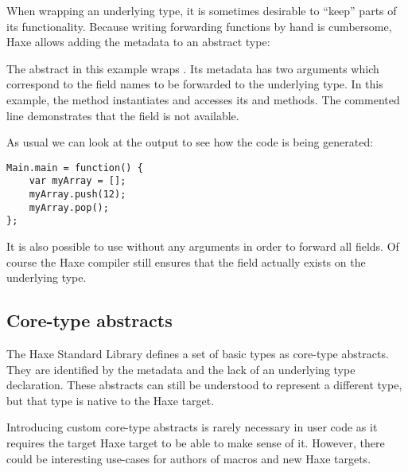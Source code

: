 When wrapping an underlying type, it is sometimes desirable to ``keep'' parts of its functionality. Because writing forwarding functions by hand is cumbersome, Haxe allows adding the  metadata to an abstract type:


The  abstract in this example wraps . Its  metadata has two arguments which correspond to the field names to be forwarded to the underlying type. In this example, the  method instantiates  and accesses its  and  methods. The commented line demonstrates that the  field is not available.

As usual we can look at the  output to see how the code is being generated:

\begin{lstlisting}
Main.main = function() {
	var myArray = [];
	myArray.push(12);
	myArray.pop();
};
\end{lstlisting}

It is also possible to use  without any arguments in order to forward all fields. Of course the Haxe compiler still ensures that the field actually exists on the underlying type.



\subsection{Core-type abstracts}
\label{types-abstract-core-type}

The Haxe Standard Library defines a set of basic types as core-type abstracts. They are identified by the  metadata and the lack of an underlying type declaration. These abstracts can still be understood to represent a different type, but that type is native to the Haxe target. 

Introducing custom core-type abstracts is rarely necessary in user code as it requires the target Haxe target to be able to make sense of it. However, there could be interesting use-cases for authors of macros and new Haxe targets.

